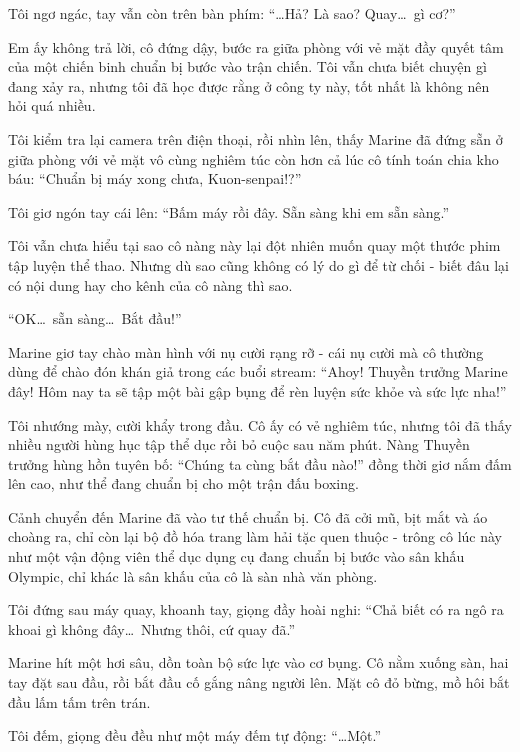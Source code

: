 \documentclass[../main.tex]{subfiles}
\begin{document}
Tôi ngơ ngác, tay vẫn còn trên bàn phím: ``\dots  Hả? Là sao? Quay\dots\ gì cơ?''

Em ấy không trả lời, cô đứng dậy, bước ra giữa phòng với vẻ mặt đầy quyết tâm của một chiến binh chuẩn bị bước vào trận chiến. Tôi vẫn chưa biết chuyện gì đang xảy ra, nhưng tôi đã học được rằng ở công ty này, tốt nhất là không nên hỏi quá nhiều.

\ct

Tôi kiểm tra lại camera trên điện thoại, rồi nhìn lên, thấy Marine đã đứng sẵn ở giữa phòng với vẻ mặt vô cùng nghiêm túc còn hơn cả lúc cô tính toán chia kho báu: ``Chuẩn bị máy xong chưa, Kuon-senpai!?''

Tôi giơ ngón tay cái lên: ``Bấm máy rồi đây. Sẵn sàng khi em sẵn sàng.''

Tôi vẫn chưa hiểu tại sao cô nàng này lại đột nhiên muốn quay một thước phim tập luyện thể thao. Nhưng dù sao cũng không có lý do gì để từ chối - biết đâu lại có nội dung hay cho kênh của cô nàng thì sao.

``OK\dots\ sẵn sàng\dots\ Bắt đầu!''

\il

Marine giơ tay chào màn hình với nụ cười rạng rỡ - cái nụ cười mà cô thường dùng để chào đón khán giả trong các buổi stream: ``Ahoy! Thuyền trưởng Marine đây! Hôm nay ta sẽ tập một bài gập bụng để rèn luyện sức khỏe và sức lực nha!''

Tôi nhướng mày, cười khẩy trong đầu. Cô ấy có vẻ nghiêm túc, nhưng tôi đã thấy nhiều người hùng hục tập thể dục rồi bỏ cuộc sau năm phút. Nàng Thuyền trưởng hùng hồn tuyên bố: ``Chúng ta cùng bắt đầu nào!'' đồng thời giơ nắm đấm lên cao, như thể đang chuẩn bị cho một trận đấu boxing.

\ct

Cảnh chuyển đến Marine đã vào tư thế chuẩn bị. Cô đã cởi mũ, bịt mắt và áo choàng ra, chỉ còn lại bộ đồ hóa trang làm hải tặc quen thuộc - trông cô lúc này như một vận động viên thể dục dụng cụ đang chuẩn bị bước vào sân khấu Olympic, chỉ khác là sân khấu của cô là sàn nhà văn phòng.

Tôi đứng sau máy quay, khoanh tay, giọng đầy hoài nghi: ``Chả biết có ra ngô ra khoai gì không đây\dots\ Nhưng thôi, cứ quay đã.''

Marine hít một hơi sâu, dồn toàn bộ sức lực vào cơ bụng. Cô nằm xuống sàn, hai tay đặt sau đầu, rồi bắt đầu cố gắng nâng người lên. Mặt cô đỏ bừng, mồ hôi bắt đầu lấm tấm trên trán.

Tôi đếm, giọng đều đều như một máy đếm tự động: ``\dots  Một.''
\end{document}
